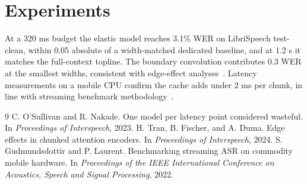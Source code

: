 \documentclass[10pt,twocolumn]{article}
\begin{document}
\section{Experiments}
At a 320 ms budget the elastic model reaches 3.1\% WER on
LibriSpeech test-clean, within 0.05 absolute of a width-matched dedicated
baseline, and at 1.2 s it matches the full-context topline. The boundary
convolution contributes 0.3 WER at the smallest widths, consistent with
edge-effect analyses~\cite{tran2024chunk}. Latency measurements on a mobile
CPU confirm the cache adds under 2 ms per chunk, in line with streaming
benchmark methodology~\cite{gudmund2022bench}.

\begin{thebibliography}{9}
 C. O'Sullivan and R. Nakade.
One model per latency point considered wasteful.
In \textit{Proceedings of Interspeech}, 2023.
 H. Tran, B. Fischer, and A. Duma.
Edge effects in chunked attention encoders.
In \textit{Proceedings of Interspeech}, 2024.
 S. Gudmundsdottir and P. Laurent.
Benchmarking streaming ASR on commodity mobile hardware.
In \textit{Proceedings of the IEEE International Conference on Acoustics, Speech and Signal Processing}, 2022.
\end{thebibliography}
\end{document}
